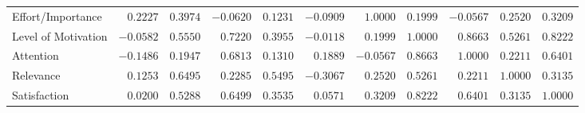\documentclass[6pt,a4paper]{article}
\begin{document}
{\begin{longtable}{lrrrrrrrrrr}
Effort/Importance&$ 0.2227$&$ 0.3974$&$-0.0620$&$ 0.1231$&$-0.0909$&$ 1.0000$&$ 0.1999$&$-0.0567$&$ 0.2520$&$0.3209$\tabularnewline
Level of Motivation&$-0.0582$&$ 0.5550$&$ 0.7220$&$ 0.3955$&$-0.0118$&$ 0.1999$&$ 1.0000$&$ 0.8663$&$ 0.5261$&$0.8222$\tabularnewline
Attention&$-0.1486$&$ 0.1947$&$ 0.6813$&$ 0.1310$&$ 0.1889$&$-0.0567$&$ 0.8663$&$ 1.0000$&$ 0.2211$&$0.6401$\tabularnewline
Relevance&$ 0.1253$&$ 0.6495$&$ 0.2285$&$ 0.5495$&$-0.3067$&$ 0.2520$&$ 0.5261$&$ 0.2211$&$ 1.0000$&$0.3135$\tabularnewline
Satisfaction&$ 0.0200$&$ 0.5288$&$ 0.6499$&$ 0.3535$&$ 0.0571$&$ 0.3209$&$ 0.8222$&$ 0.6401$&$ 0.3135$&$1.0000$\tabularnewline
\hline
\end{longtable}}

\end{document}
